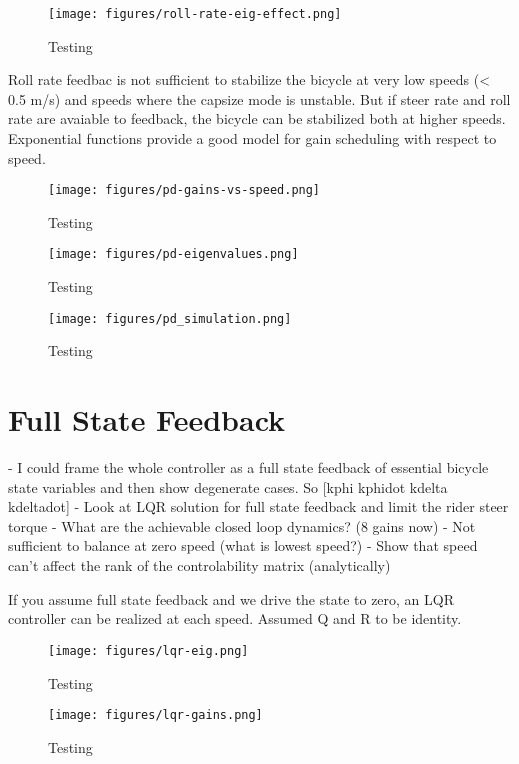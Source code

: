 \documentclass[12pt]{article}
\begin{document}
\begin{figure}
  \centering
  \texttt{[image: figures/roll-rate-eig-effect.png]}
  \caption{Testing}
  \label{fig:roll-rate-eig-effect}
\end{figure}

Roll rate feedbac is not sufficient to stabilize the bicycle at very low speeds
(< 0.5 m/s) and speeds where the capsize mode is unstable. But if steer rate
and roll rate are avaiable to feedback, the bicycle can be stabilized both at
higher speeds. Exponential functions provide a good model for gain scheduling
with respect to speed.

\begin{figure}
  \centering
  \texttt{[image: figures/pd-gains-vs-speed.png]}
  \caption{Testing}
  \label{fig:pd-gains-vs-speed}
\end{figure}

\begin{figure}
  \centering
  \texttt{[image: figures/pd-eigenvalues.png]}
  \caption{Testing}
  \label{fig:pd-eigenvalues}
\end{figure}

\begin{figure}
  \centering
  \texttt{[image: figures/pd\_simulation.png]}
  \caption{Testing}
  \label{fig:pd_simulation}
\end{figure}

\section{Full State Feedback}

- I could frame the whole controller as a full state feedback of essential
bicycle state variables and then show degenerate cases. So [kphi kphidot kdelta
kdeltadot]
- Look at LQR solution for full state feedback and limit the rider steer torque
- What are the achievable closed loop dynamics? (8 gains now)
- Not sufficient to balance at zero speed (what is lowest speed?)
- Show that speed can't affect the rank of the controlability matrix
(analytically)

If you assume full state feedback and we drive the state to zero, an LQR
controller can be realized at each speed. Assumed Q and R to be identity.

\begin{figure}
  \centering
  \texttt{[image: figures/lqr-eig.png]}
  \caption{Testing}
  \label{fig:lqr-eig}
\end{figure}

\begin{figure}
  \centering
  \texttt{[image: figures/lqr-gains.png]}
  \caption{Testing}
  \label{fig:lqr-gains}
\end{figure}
\end{document}
